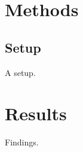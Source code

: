 \documentclass{article}
\begin{document}
\section{Methods}
\subsection{Setup}
A setup.
\section{Results}\label{sec:r}
Findings.
\end{document}
